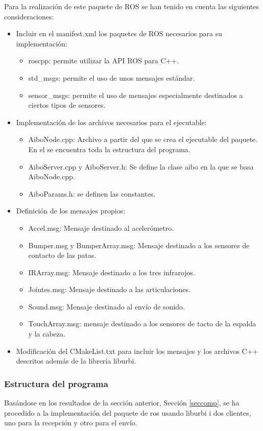 \documentclass[12pt,a4paper,final,twoside]{article}
\begin{document}
Para la realización de este paquete de ROS se han tenido en cuenta las siguientes consideraciones:
\begin{itemize}
\item Incluir en el manifest.xml los paquetes de ROS necesarios para su implementación:
\begin{itemize}
\item roscpp: permite utilizar la API ROS para C++.
\item std{\_}msgs: permite el uso de unos mensajes estándar.
\item sensor{\_}msgs: permite el uso de mensajes especialmente destinados a ciertos tipos de sensores.
\end{itemize}
\item Implementación de los archivos necesarios para el ejecutable:
\begin{itemize}
\item AiboNode.cpp: Archivo a partir del que se crea el ejecutable del paquete. En el se encuentra toda la estructura del programa.
\item AiboServer.cpp y AiboServer.h: Se define la clase aibo en la que se basa AiboNode.cpp.
\item AiboParams.h: se definen las constantes.
\end{itemize} 
\item Definición de los mensajes propios:
\begin{itemize}
\item Accel.msg: Mensaje destinado al acelerómetro.
\item Bumper.msg y BumperArray.msg: Mensaje destinado a los sensores de contacto de las patas.
\item IRArray.msg: Mensaje destinado a los tres infrarojos.
\item Jointes.msg: Mensaje destinado a las articulaciones.
\item Sound.msg: Mensaje destinado al envío de sonido.
\item TouchArray.msg: mensaje destinado a los sensores de tacto de la espalda y la cabeza.
\end{itemize}
\item Modificación del CMakeList.txt para incluir los mensajes y los archivos C++ descritos además de la librería liburbi.
\end{itemize}

\subsubsection{Estructura del programa}
Basándose en los resultados de la sección anterior, Sección \ref{seccomp}, se ha procedido a la implementación del paquete de ros usando liburbi i dos clientes, uno para la recepción  y otro para el envío.
\end{document}
